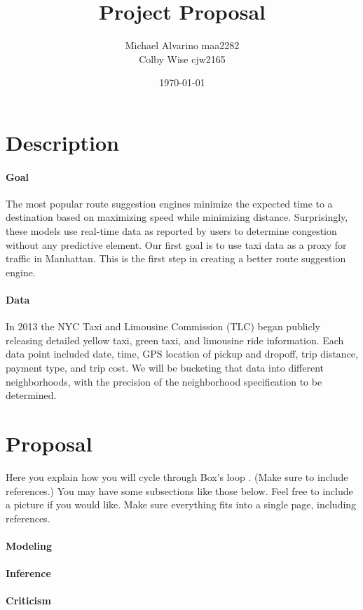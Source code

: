 \documentclass{article}
\begin{document}
\title{\textbf{Project Proposal}}
\date{\today}
\author{
Michael Alvarino maa2282\\
Colby Wise cjw2165
}

\maketitle

\section{Description}

\paragraph{Goal} The most popular route suggestion engines minimize the expected time to a destination based on maximizing speed while minimizing distance. Surprisingly, these models use real-time data as reported by users to determine congestion without any predictive element. Our first goal is to use taxi data as a proxy for traffic in Manhattan. This is the first step in creating a better route suggestion engine.

\paragraph{Data} In 2013 the NYC Taxi and Limousine Commission (TLC) began publicly releasing detailed yellow taxi, green taxi, and limousine ride information. Each data point included date, time, GPS location of pickup and dropoff, trip distance, payment type, and trip cost. We will be bucketing that data into different neighborhoods, with the precision of the neighborhood specification to be determined.

\section{Proposal}

Here you explain how you will cycle through Box's loop \citep{box1976science}.
(Make sure to include references.) You may have some subsections like those
below. Feel free to include a picture if you would like. Make sure everything
fits into a single page, including references.

\paragraph{Modeling}

\paragraph{Inference}

\paragraph{Criticism}




\end{document}
